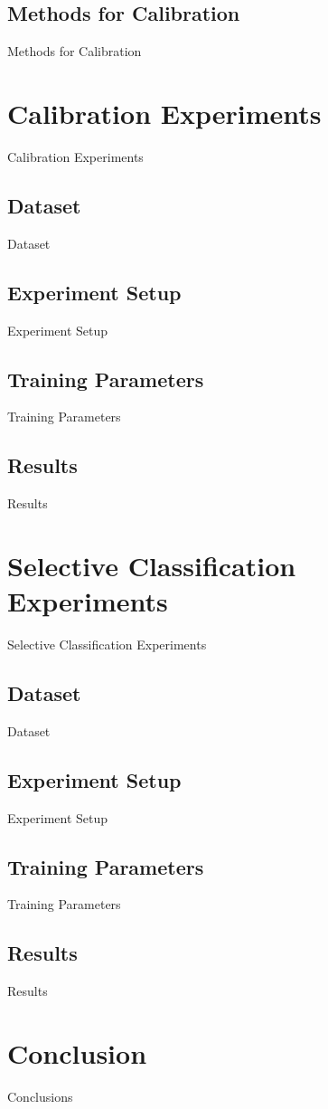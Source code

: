 \subsection{Methods for Calibration}
Methods for Calibration



\section{Calibration Experiments}
Calibration Experiments

\subsection{Dataset}
Dataset

\subsection{Experiment Setup}
Experiment Setup

\subsection{Training Parameters}
Training Parameters

\subsection{Results}
Results



\section{Selective Classification Experiments}
Selective Classification Experiments

\subsection{Dataset}
Dataset

\subsection{Experiment Setup}
Experiment Setup

\subsection{Training Parameters}
Training Parameters

\subsection{Results}
Results



\section{Conclusion}
Conclusions